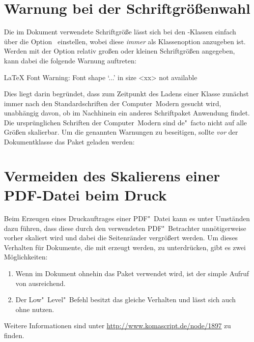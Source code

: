 \section{%
  Warnung bei der Schriftgrößenwahl%
  \label{sec:tips:fontsize}%
}
%
%
Die im Dokument verwendete Schriftgröße lässt sich bei den \KOMAScript-Klassen 
einfach über die Option~ einstellen, wobei diese \emph{immer} 
als Klassenoption anzugeben ist. Werden mit der Option relativ großen oder 
kleinen Schriftgrößen angegeben, kann dabei die folgende Warnung auftreten:
%
\begin{quoting}[rightmargin=0pt]
\begin{Code}[escapechar=§]
LaTeX Font Warning: Font shape `...' in size <xx> not available
\end{Code}
\end{quoting}
%
Dies liegt darin begründet, dass zum Zeitpunkt des Ladens einer Klasse zunächst 
immer nach den Standardschriften der Computer~Modern gesucht wird, unabhängig 
davon, ob im Nachhinein ein anderes Schriftpaket Anwendung findet. Die 
ursprünglichen Schriften der Computer~Modern sind de"~facto nicht auf alle 
Größen skalierbar. Um die genannten Warnungen zu beseitigen, sollte \emph{vor} 
der Dokumentklasse das Paket  geladen werden:
%
\begin{quoting}[rightmargin=0pt]
\end{quoting}



\section{Vermeiden des Skalierens einer PDF-Datei beim Druck}
%
%
Beim Erzeugen eines Druckauftrages einer PDF"~Datei kann es unter Umständen 
dazu führen, dass diese durch den verwendeten PDF"~Betrachter unnötigerweise 
vorher skaliert wird und dabei die Seitenränder vergrößert werden. Um dieses 
Verhalten für Dokumente, die mit  erzeugt werden, zu 
unterdrücken, gibt es zwei Möglichkeiten:
%
\begin{enumerate}
\item Wenn im Dokument ohnehin das Paket  verwendet wird, 
  ist der simple Aufruf von 
  ausreichend.
\item Der Low"~Level"~Befehl
  besitzt das gleiche Verhalten und lässt sich auch ohne  
  nutzen.
\end{enumerate}
%
Weitere Informationen sind unter \mbox{\url{http://www.komascript.de/node/1897}}
zu finden.



